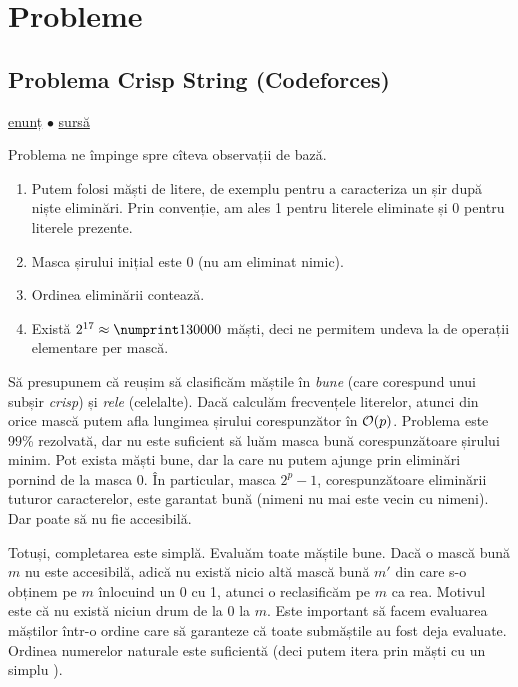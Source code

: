 \documentclass[../main.tex]{subfiles}
\begin{document}
\section{Probleme}

\subsection{Problema Crisp String (Codeforces)}
\label{problem:crisp-string}

\href{https://codeforces.com/contest/1117/problem/F}{enunț}
$\bullet$
\hyperref[code:crisp-string]{sursă}

Problema ne împinge spre cîteva observații de bază.

\begin{enumerate}
  \item Putem folosi măști de litere, de exemplu pentru a caracteriza un șir după niște eliminări. Prin convenție, am ales 1 pentru literele eliminate și 0 pentru literele prezente.

  \item Masca șirului inițial este 0 (nu am eliminat nimic).

  \item Ordinea eliminării contează.

  \item Există $2^{17} \approx \np{130000}$ măști, deci ne permitem undeva la  de operații elementare per mască.
\end{enumerate}

Să presupunem că reușim să clasificăm măștile în \textit{bune} (care corespund unui subșir \textit{crisp}) și \textit{rele} (celelalte). Dacă calculăm frecvențele literelor, atunci din orice mască putem afla lungimea șirului corespunzător în $\mathcal{O}(p)$. Problema este 99\% rezolvată, dar nu este suficient să luăm masca bună corespunzătoare șirului minim. Pot exista măști bune, dar la care nu putem ajunge prin eliminări pornind de la masca 0. În particular, masca  $2^p - 1$, corespunzătoare eliminării tuturor caracterelor, este garantat bună (nimeni nu mai este vecin cu nimeni). Dar poate să nu fie accesibilă.

Totuși, completarea este simplă. Evaluăm toate măștile bune. Dacă o mască bună $m$ nu este accesibilă, adică nu există nicio altă mască bună $m'$ din care s-o obținem pe $m$ înlocuind un 0 cu 1, atunci o reclasificăm pe $m$ ca rea. Motivul este că nu există niciun drum de la 0 la $m$. Este important să facem evaluarea măștilor într-o ordine care să garanteze că toate submăștile au fost deja evaluate. Ordinea numerelor naturale este suficientă (deci putem itera prin măști cu un simplu ).
\end{document}
